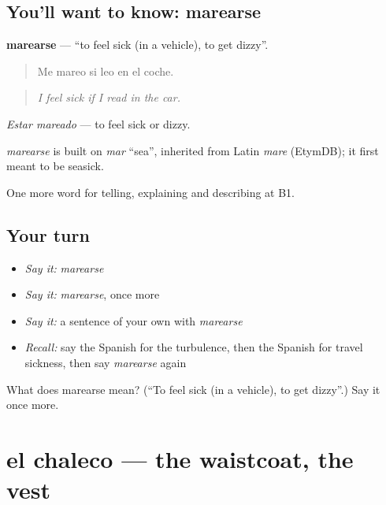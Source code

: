 \subsection*{You'll want to know: marearse}
\textbf{marearse} — \textquotedblleft{}to feel sick (in a vehicle), to get dizzy\textquotedblright{}.

\begin{quote}
Me mareo si leo en el coche.
\end{quote}

\begin{quote}
\emph{I feel sick if I read in the car.}
\end{quote}

\emph{Estar mareado} — to feel sick or dizzy.

\begin{cousinweb}
\emph{marearse} is built on \emph{mar} \textquotedblleft{}sea\textquotedblright{}, inherited from Latin \emph{mare} (EtymDB); it first meant to be seasick.
\end{cousinweb}

\begin{grammarlens}[title={What you've built}]
One more word for telling, explaining and describing at B1.
\end{grammarlens}

\subsection*{Your turn}
\begin{itemize}
\raggedright
  \item \emph{Say it:} \emph{marearse}
  \item \emph{Say it:} \emph{marearse}, once more
  \item \emph{Say it:} a sentence of your own with \emph{marearse}
  \item \emph{Recall:} say the Spanish for the turbulence, then the Spanish for travel sickness, then say \emph{marearse} again
\end{itemize}

\begin{tcolorbox}[breakable,colback=teal!4,colframe=teal!35!black,title={Before you move on}]
What does marearse mean? (\textquotedblleft{}To feel sick (in a vehicle), to get dizzy\textquotedblright{}.) Say it once more.
\end{tcolorbox}
\section[el chaleco]{el chaleco — the waistcoat, the vest}

